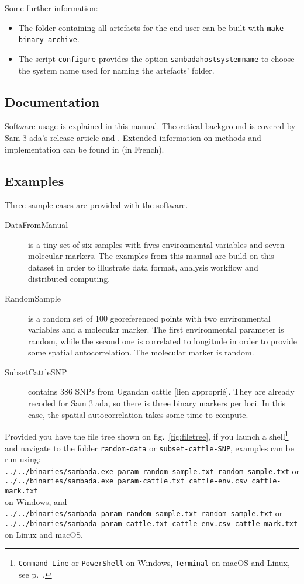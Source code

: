 \documentclass[a4paper,11pt]{article}
\newcommand{\smb}{\textsf{Sam$\upbeta$ada}}
\newcommand{\prog}[1]{\texttt{#1}}
\begin{document}
Some further information: 
\begin{itemize}
\item{The folder containing all artefacts for the end-user can be built with \prog{make binary-archive}.}
\item{The script \prog{configure} provides the option \prog{sambadahostsystemname} to choose the system name used for naming the artefacts' folder.}
\end{itemize}

\subsection*{Documentation}
Software usage is explained in this manual.
Theoretical background is covered by \smb's release article \textcite{stucki:2016} and \textcite{joost:2007}.
Extended information on methods and implementation can be found in \textcite{stucki:2014} (in French).

\subsection*{Examples}
Three sample cases are provided with the software.
\begin{description}
\item[DataFromManual] is a tiny set of six samples with fives environmental variables and seven molecular markers.
The examples from this manual are build on this dataset in order to illustrate data format, analysis workflow and distributed computing. 
\item[RandomSample] is a random set of 100 georeferenced points with two environmental variables and a molecular marker.
The first environmental parameter is random, while the second one is correlated to longitude in order to provide some spatial autocorrelation.
The molecular marker is random.
\item[SubsetCattleSNP] contains 386 SNPs from Ugandan cattle [lien approprié].
They are already recoded for \smb, so there is three binary markers per loci.
In this case, the spatial autocorrelation takes some time to compute.
\end{description}

Provided you have the file tree shown on fig.~\ref{fig:filetree},
if you launch a shell\footnote{\prog{Command Line} or \prog{PowerShell} on Windows, \prog{Terminal} on macOS and Linux, see p.~\pageref{faq:commandline}.} and navigate to the folder \prog{random-data} or \prog{subset-cattle-SNP}, examples can be run using: \\
\verb+../../binaries/sambada.exe param-random-sample.txt random-sample.txt+ or\\
\verb+../../binaries/sambada.exe param-cattle.txt cattle-env.csv cattle-mark.txt+ \\
\label{sec:examples-launch}
on Windows, and \\
\verb+../../binaries/sambada param-random-sample.txt random-sample.txt+ or\\
\verb+../../binaries/sambada param-cattle.txt cattle-env.csv cattle-mark.txt+
on Linux and macOS.
\end{document}
